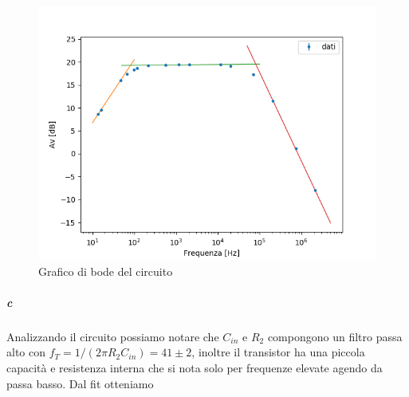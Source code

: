 \documentclass[10pt,a4paper]{article}
\begin{document}
\begin{figure}
	\centering
    \includegraphics[scale=0.8]{fit.png} 
    \caption{Grafico di bode del circuito}
    \label{fig:fit}
\end{figure}
    
\subparagraph{c}
Analizzando il circuito possiamo notare che $C_{in}$ e $R_2$ compongono un filtro passa alto con $f_T=1/(2\pi R_2 C_{in})=41\pm 2$, inoltre il transistor ha una piccola capacità e resistenza interna che si nota solo per frequenze elevate agendo da passa basso. Dal fit otteniamo 
		
\end{document}
